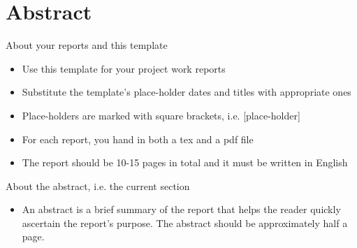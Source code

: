 \documentclass[Main]{subfiles}
\begin{document}
\chapter*{Abstract}

About your reports and this template
\begin{itemize}
\item Use this template for your project work reports
\item Substitute the template's place-holder dates and titles with appropriate ones
\item Place-holders are marked with square brackets, i.e. [place-holder]
\item For each report, you hand in both a tex and a pdf file
\item The report should be 10-15 pages in total and it must be written in English
\end{itemize}

About the abstract, i.e. the current section
\begin{itemize}
\item An abstract is a brief summary of the report that helps the
  reader quickly ascertain the report's purpose. The abstract should
  be approximately half a page.
\end{itemize}


\setcounter{tocdepth}{1}
\tableofcontents
\end{document}
